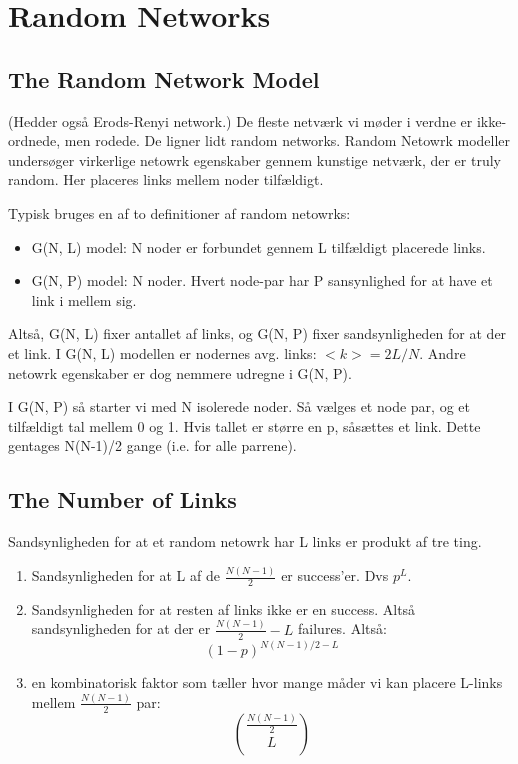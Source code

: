 \documentclass[11pt]{article}
\begin{document}
\section{Random Networks}
\label{sec:org83ae6c8}
\subsection{The Random Network Model}
\label{sec:org8bdf38b}
(Hedder også Erods-Renyi network.) De fleste netværk vi møder i verdne er ikke-ordnede, men rodede. De ligner lidt random networks. Random Netowrk modeller undersøger virkerlige netowrk egenskaber gennem kunstige netværk, der er truly random. Her placeres links mellem noder tilfældigt. 

Typisk bruges en af to definitioner af random netowrks: 
\begin{itemize}
\item G(N, L) model: N noder er forbundet gennem L tilfældigt placerede links.
\item G(N, P) model: N noder. Hvert node-par har P sansynlighed for at have et link i mellem sig.
\end{itemize}

Altså, G(N, L) fixer antallet af links, og G(N, P) fixer sandsynligheden for at der et link.  I G(N, L) modellen er nodernes avg. links: \(<k> = 2L/N\). Andre netowrk egenskaber er dog nemmere udregne i G(N, P). 

I G(N, P) så starter vi med N isolerede noder. Så vælges et node par, og et tilfældigt tal mellem 0 og 1. Hvis tallet er større en p, såsættes et link. Dette gentages N(N-1)/2 gange (i.e. for alle parrene).

\subsection{The Number of Links}
\label{sec:org2f378fe}
Sandsynligheden for at et random netowrk har L links er produkt af tre ting. 

\begin{enumerate}
\item Sandsynligheden for at L af de \(\frac{N(N-1)}{2}\) er success'er. Dvs \(p^{L}\).
\item Sandsynligheden for at resten af links ikke er en success. Altså sandsynligheden for at der er \(\frac{N(N-1)}{2} - L\) failures. Altså: $$(1 - p)^{N(N-1)/2 - L}$$
\item en kombinatorisk faktor som tæller hvor mange måder vi kan placere L-links mellem \(\frac{N(N-1)}{2}\) par: $$ \binom{\frac{N(N-1)}{2}}{L} $$
\end{enumerate}
\end{document}
